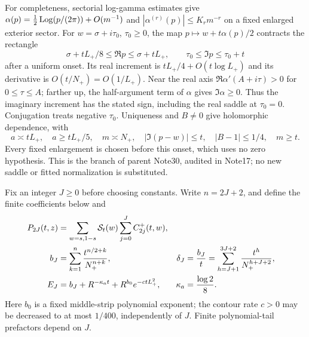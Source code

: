 For completeness, sectorial log-gamma estimates \cite{dlmf-gamma}
give $\alpha(p)=\tfrac12\operatorname{Log}(p/(2\pi))+O(m^{-1})$ and
$|\alpha^{(r)}(p)|\le K_rm^{-r}$ on a fixed enlarged exterior
sector. For $w=\sigma+i\tau_0$, $\tau_0\ge0$, the map
$p\mapsto w+t\alpha(p)/2$ contracts the rectangle
\[
 \sigma+tL_+/8\le\Re p\le\sigma+tL_+,
 \qquad \tau_0\le\Im p\le\tau_0+t
\]
after a uniform onset. Its real increment is
$tL_+/4+O(t\log L_+)$ and its derivative is
$O(t/N_+)=O(1/L_+)$. Near the real axis
$\Re\alpha'(A+i\tau)>0$ for $0\le\tau\le A$; farther up,
the half-argument term of $\alpha$ gives $\Im\alpha\ge0$.
Thus the imaginary increment has the stated sign, including the real
saddle at $\tau_0=0$. Conjugation treats negative $\tau_0$.
Uniqueness and $B\ne0$ give holomorphic dependence, with
\begin{equation}
 a\asymp tL_+,\quad a\ge tL_+/5,\quad m\asymp N_+,
 \quad |\Im(p-w)|\le t,\quad |B-1|\le1/4,\quad m\ge t.
 \label{eq:positive-branch-gates}
\end{equation}
Every fixed enlargement is chosen before this onset, which uses no
zero hypothesis. This is the branch of parent Note30, audited in
Note17; no new saddle or fitted normalization is substituted.

Fix an integer $J\ge0$ before choosing constants. Write $n=2J+2$,
and define the finite coefficients below and
\begin{align}
 P_{2J}(t,z)&=\sum_{w=s,1-s}\mathcal S_t(w)\sum_{j=0}^J C_{2j}^{+}(t,w),\notag\\
 b_J&=\sum_{k=1}^{n}\frac{t^{n/2+k}}{N_+^{n+k}},
 &\delta_J&=\frac{b_J}{t}
 =\sum_{h=J+1}^{3J+2}\frac{t^h}{N_+^{h+J+2}},\notag\\
 E_J&=b_J+R^{-\kappa_at}+R^{b_0}e^{-ctL_+^2},
 &\kappa_a&=\frac{\log2}{8}.
 \label{eq:positive-full-budget}
\end{align}
Here $b_0$ is a fixed middle-strip polynomial exponent; the contour
rate $c>0$ may be decreased to at most $1/400$, independently of
$J$. Finite polynomial-tail prefactors depend on $J$.

